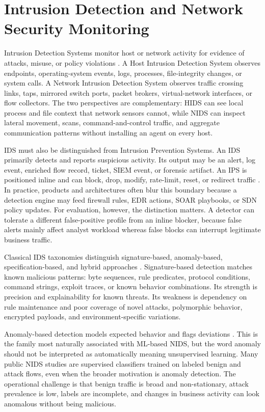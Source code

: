 \section{Intrusion Detection and Network Security Monitoring}

Intrusion Detection Systems monitor host or network activity for evidence of attacks, misuse, or policy violations \parencite{ScarfoneMell2007}. A Host Intrusion Detection System observes endpoints, operating-system events, logs, processes, file-integrity changes, or system calls. A Network Intrusion Detection System observes traffic crossing links, taps, mirrored switch ports, packet brokers, virtual-network interfaces, or flow collectors. The two perspectives are complementary: HIDS can see local process and file context that network sensors cannot, while NIDS can inspect lateral movement, scans, command-and-control traffic, and aggregate communication patterns without installing an agent on every host.

IDS must also be distinguished from Intrusion Prevention Systems. An IDS primarily detects and reports suspicious activity. Its output may be an alert, log event, enriched flow record, ticket, SIEM event, or forensic artifact. An IPS is positioned inline and can block, drop, modify, rate-limit, reset, or redirect traffic \parencite{ScarfoneMell2007}. In practice, products and architectures often blur this boundary because a detection engine may feed firewall rules, EDR actions, SOAR playbooks, or SDN policy updates. For evaluation, however, the distinction matters. A detector can tolerate a different false-positive profile from an inline blocker, because false alerts mainly affect analyst workload whereas false blocks can interrupt legitimate business traffic.

Classical IDS taxonomies distinguish signature-based, anomaly-based, specification-based, and hybrid approaches \parencite{ScarfoneMell2007}. Signature-based detection matches known malicious patterns: byte sequences, rule predicates, protocol conditions, command strings, exploit traces, or known behavior combinations. Its strength is precision and explainability for known threats. Its weakness is dependency on rule maintenance and poor coverage of novel attacks, polymorphic behavior, encrypted payloads, and environment-specific variations.

Anomaly-based detection models expected behavior and flags deviations \parencite{SommerPaxson2010ClosedWorld,Ring2019DatasetSurvey}. This is the family most naturally associated with ML-based NIDS, but the word anomaly should not be interpreted as automatically meaning unsupervised learning. Many public NIDS studies are supervised classifiers trained on labeled benign and attack flows, even when the broader motivation is anomaly detection. The operational challenge is that benign traffic is broad and non-stationary, attack prevalence is low, labels are incomplete, and changes in business activity can look anomalous without being malicious.

